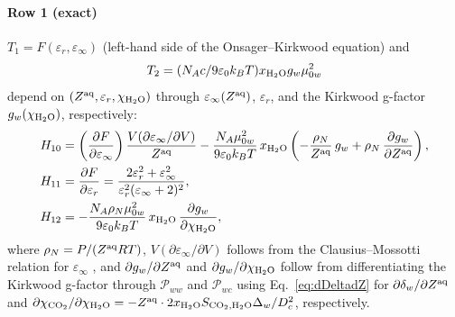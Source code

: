 \documentclass[preprint,12pt,number]{elsarticle}
\begin{document}
\paragraph{Row 1 (exact)}
$T_1 = F(\varepsilon_r,\varepsilon_\infty)$ (left-hand side of the Onsager--Kirkwood
equation) and $$T_2 = (N_Ac/9\varepsilon_0k_BT)x_{\rm H_2O} g_w\mu_{0w}^2$$ depend on
$(Z^{\rm aq},\varepsilon_r,\chi_{\rm H_2O})$ through $\varepsilon_\infty(Z^{\rm aq})$, $\varepsilon_r$,
and the Kirkwood g-factor $g_w(\chi_{\rm H_2O})$, respectively:
\begin{align}
  H_{10} &= \left(\frac{\partial F}{\partial\varepsilon_\infty}\right)
             \frac{V(\partial\varepsilon_\infty/\partial V)}{Z^{\rm aq}}
           - \frac{N_A\mu_{0w}^2}{9\varepsilon_0 k_BT}\,x_{\rm H_2O}
             \left(-\frac{\rho_N}{Z^{\rm aq}}\,g_w
                   + \rho_N\,\frac{\partial g_w}{\partial Z^{\rm aq}}\right),
             \label{eq:H10} \\
  H_{11} &= \frac{\partial F}{\partial\varepsilon_r}
           = \frac{2\varepsilon_r^2+\varepsilon_\infty^2}
                  {\varepsilon_r^2(\varepsilon_\infty+2)^2},
             \label{eq:H11} \\
  H_{12} &= -\frac{N_A\rho_N\mu_{0w}^2}{9\varepsilon_0 k_BT}\,x_{\rm H_2O}\,
              \frac{\partial g_w}{\partial\chi_{\rm H_2O}},
             \label{eq:H12}
\end{align}
where $\rho_N = P/(Z^{\rm aq}RT)$, $V(\partial\varepsilon_\infty/\partial V)$ follows
from the Clausius--Mossotti relation for $\varepsilon_\infty$ \citep{Coelho2025},
and $\partial g_w/\partial Z^{\rm aq}$ and $\partial g_w/\partial\chi_{\rm H_2O}$ follow from
differentiating the Kirkwood g-factor \citep{Coelho2025} through
$\mathcal{P}_{ww}$ and $\mathcal{P}_{wc}$
using Eq.~\eqref{eq:dDeltadZ} for $\partial\delta_w/\partial Z^{\rm aq}$ and
$\partial\chi_{\rm CO_2}/\partial\chi_{\rm H_2O} = -Z^{\rm aq}\cdot 2x_{\rm H_2O}S_{{\rm CO_2},{\rm H_2O}}\Delta_w/D_c^2$,
respectively.
\end{document}
